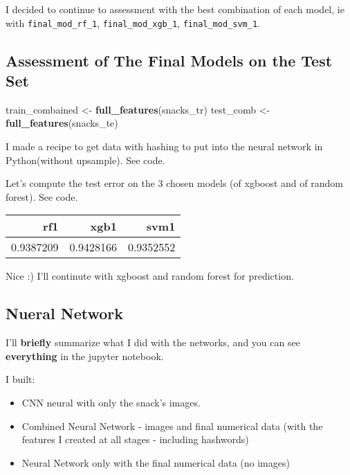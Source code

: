 \documentclass[
]{article}
\newenvironment{Shaded}{\begin{snugshade}}{\end{snugshade}}
\newcommand{\KeywordTok}[1]{\textcolor[rgb]{0.13,0.29,0.53}{\textbf{#1}}}
\newcommand{\NormalTok}[1]{#1}
\newcommand{\StringTok}[1]{\textcolor[rgb]{0.31,0.60,0.02}{#1}}
\providecommand{\tightlist}{%
  \setlength{\itemsep}{0pt}\setlength{\parskip}{0pt}}
\begin{document}
I decided to continue to assessment with the best combination of each
model, ie with \texttt{final\_mod\_rf\_1}, \texttt{final\_mod\_xgb\_1},
\texttt{final\_mod\_svm\_1}.

\hypertarget{assessment-of-the-final-models-on-the-test-set}{%
\subsection{Assessment of The Final Models on the Test
Set}\label{assessment-of-the-final-models-on-the-test-set}}

\begin{Shaded}
\begin{Highlighting}[]
\NormalTok{train_combained <-}\StringTok{ }\KeywordTok{full_features}\NormalTok{(snacks_tr) }
\NormalTok{test_comb <-}\StringTok{ }\KeywordTok{full_features}\NormalTok{(snacks_te)}
\end{Highlighting}
\end{Shaded}

I made a recipe to get data with hashing to put into the neural network
in Python(without upsample). See code.

Let's compute the test error on the 3 chosen models (of xgboost and of
random forest). See code.

\begin{table}[H]
\centering\begingroup\fontsize{9}{11}\selectfont

\begin{tabular}{rrr}
\toprule
rf1 & xgb1 & svm1\\
\midrule
\rowcolor{gray!6}  0.9387209 & 0.9428166 & 0.9352552\\
\bottomrule
\end{tabular}
\endgroup{}
\end{table}

Nice :) I'll continute with xgboost and random forest for prediction.

\hypertarget{nueral-network}{%
\subsection{Nueral Network}\label{nueral-network}}

I'll \textbf{briefly} summarize what I did with the networks, and you
can see \textbf{everything} in the jupyter notebook.

I built:

\begin{itemize}
\tightlist
\item
  CNN neural with only the snack's images.
\item
  Combined Neural Network - images and final numerical data (with the
  features I created at all stages - including hashwords)
\item
  Neural Network only with the final numerical data (no images)
\end{itemize}
\end{document}

